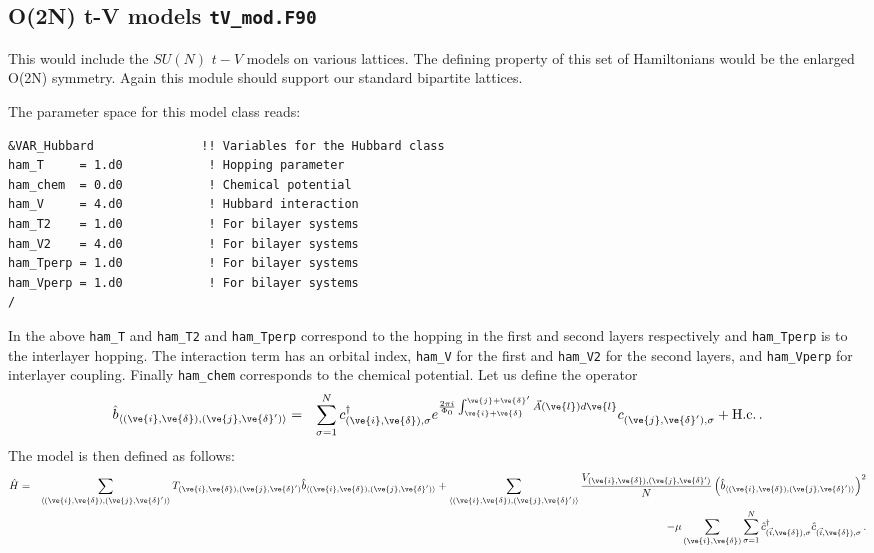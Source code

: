 \subsection{  O(2N)  t-V models  \texttt{tV\_mod.F90}}

This would include the $SU(N)$  $t-V$ models on various lattices.  The defining property of this set of Hamiltonians would be the enlarged O(2N) symmetry.  Again  this   module should support our standard bipartite lattices. 

The parameter space for this model class  reads: 

\begin{lstlisting}[style=fortran,escapechar=\#,breaklines=true]
&VAR_Hubbard               !! Variables for the Hubbard class
ham_T     = 1.d0            ! Hopping parameter
ham_chem  = 0.d0            ! Chemical potential
ham_V     = 4.d0            ! Hubbard interaction
ham_T2    = 1.d0            ! For bilayer systems
ham_V2    = 4.d0            ! For bilayer systems
ham_Tperp = 1.d0            ! For bilayer systems
ham_Vperp = 1.d0            ! For bilayer systems
/

\end{lstlisting}
In the above   \texttt{ham\_T} and \texttt{ham\_T2} and \texttt{ham\_Tperp}   correspond to the hopping in the first and second layers respectively and  \texttt{ham\_Tperp}   is to the interlayer hopping.   The interaction term has an orbital index, 
\texttt{ham\_V}  for the first and  \texttt{ham\_V2}  for the second layers,  and \texttt{ham\_Vperp} for interlayer coupling.  Finally   \texttt{ham\_chem}  corresponds to the chemical potential. Let us define the operator
\begin{eqnarray}
\hat{b}_{\langle (\ve{i},\ve{\delta}), (\ve{j},\ve{\delta}') \rangle} & = &  \sum_{\sigma =1}^{N}    c^{\dagger}_{(\ve{i},\ve{\delta}), \sigma }   e^{\frac{2 \pi i}{\Phi_0} \int_{\ve{i} + \ve{\delta}}^{\ve{j} + \ve{\delta}'}  
	\vec{A}(\ve{l})  d \ve{l}} c^{}_{(\ve{j},\ve{\delta}'),\sigma} 
+ \textrm{H.c.} \,.
\end{eqnarray}
The model is then defined as follows:
\begin{eqnarray}
\hat{H}= & & \sum_{\langle (\ve{i},\ve{\delta}), (\ve{j},\ve{\delta}') \rangle}   T_{(\ve{i},\ve{\delta}), (\ve{j},\ve{\delta}')}    \hat{b}_{\langle (\ve{i},\ve{\delta}), (\ve{j},\ve{\delta}') \rangle}
+ \sum_{\langle (\ve{i},\ve{\delta}), (\ve{j},\ve{\delta}') \rangle}  \frac{V_{(\ve{i},\ve{\delta}), (\ve{j},\ve{\delta}')}}{N} \left(  \hat{b}_{\langle (\ve{i},\ve{\delta}), (\ve{j},\ve{\delta}') \rangle}  \right)^2  \nonumber \\
& & - \mu \sum_{(\ve{i},\ve{\delta})}  \sum_{\sigma =1}^{N} \hat{c}^{\dagger}_{(\vec{i},\ve{\delta}),\sigma } \hat{c}^{\phantom\dagger}_{(\vec{i},\ve{\delta}),\sigma } \,.
\end{eqnarray}
